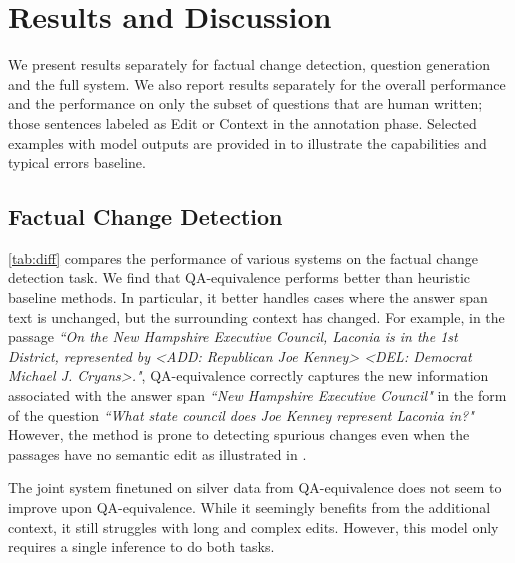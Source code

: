\section{Results and Discussion}
We present results separately for factual change detection, question generation and the full system. We also report results separately for the overall performance and the performance on only the subset of questions that are human written; those sentences labeled as Edit or Context in the annotation phase. Selected examples with model outputs are provided in  to illustrate the capabilities and typical errors baseline.

\subsection{Factual Change Detection}
\label{subsec:results:fact}


\autoref{tab:diff} compares the performance of various systems on the factual change detection task.
We find that QA-equivalence performs better than heuristic baseline methods. In particular, it better handles cases where the answer span text is unchanged, but the surrounding context has changed. For example, in the passage \textit{``On the New Hampshire Executive Council, Laconia is in the 1st District, represented by <ADD: Republican Joe Kenney> <DEL: Democrat Michael J. Cryans>."}, QA-equivalence correctly captures the new information associated with the answer span \textit{``New Hampshire Executive Council"} in the form of the question \textit{``What state council does Joe Kenney represent Laconia in?"} 					
However, the method is prone to detecting spurious changes even when the passages have no semantic edit as illustrated in .




The joint system finetuned on silver data from QA-equivalence does not seem to improve upon QA-equivalence. 
While it seemingly benefits from the additional context, it still struggles with long and complex edits. However, this model only requires a single inference to do both tasks.

